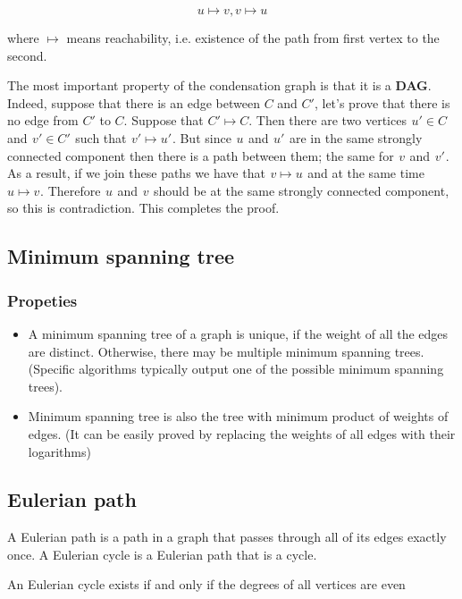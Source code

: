$$u \mapsto v, v \mapsto u$$

where $\mapsto$ means reachability, i.e. existence of the path from first vertex to the second.

The most important property of the condensation graph is that it is a \textbf{DAG}. Indeed, suppose that there is an edge between $C$ and $C'$, let's prove that there is no edge from $C'$ to $C$. Suppose that $C' \mapsto C$. Then there are two vertices  $u' \in C$  and  $v' \in C'$  such that  $v' \mapsto u'$ . But since  $u$  and  $u'$  are in the same strongly connected component then there is a path between them; the same for  $v$  and  $v'$ . As a result, if we join these paths we have that  $v \mapsto u$  and at the same time  $u \mapsto v$ . Therefore  $u$  and  $v$  should be at the same strongly connected component, so this is contradiction. This completes the proof.

\subsection{Minimum spanning tree}

\subsubsection{Propeties}

\begin{itemize}
    \item A minimum spanning tree of a graph is unique, if the weight of all the edges are distinct. Otherwise, there may be multiple minimum spanning trees. (Specific algorithms typically output one of the possible minimum spanning trees).

    \item Minimum spanning tree is also the tree with minimum product of weights of edges. (It can be easily proved by replacing the weights of all edges with their logarithms)
\end{itemize}

\subsection{Eulerian path}

A Eulerian path is a path in a graph that passes through all of its edges exactly once. A Eulerian cycle is a Eulerian path that is a cycle.

An Eulerian cycle exists if and only if the degrees of all vertices are even

